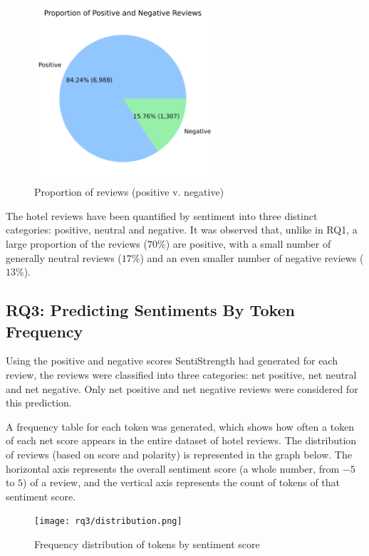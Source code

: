 \documentclass[12pt, bibliography=totocnumbered, paper=a4]{scrartcl}
\begin{document}
\begin{figure}[htpb]
	\begin{center}
		\includegraphics[width=0.6\textwidth]{rq2/pie_chart_2part.png}
	\end{center}
	\caption{Proportion of reviews (positive v. negative)}
	\label{fig:reviews-pie4}
\end{figure}

The hotel reviews have been quantified by sentiment into three distinct categories:
positive, neutral and negative. It was observed that, unlike in RQ1, a large proportion
of the reviews ($70\%$) are positive, with a small number of generally neutral reviews ($17\%$)
and an even smaller number of negative reviews ($13\%$).

\subsection{RQ3: Predicting Sentiments By Token Frequency}
Using the positive and negative scores SentiStrength had generated for
each review, the reviews were classified into three categories: net positive,
net neutral and net negative. Only net positive and net negative reviews were
considered for this prediction.

A frequency table for each token was generated, which shows
how often a token of each net score appears in the entire dataset
of hotel reviews. The distribution of reviews (based on score and
polarity) is represented in the graph below. The horizontal axis represents
the overall sentiment score (a whole number, from $-5$ to $5$) of a review,
and the vertical axis represents the count of tokens of that sentiment score.

\begin{figure}[htpb]
	\begin{center}
		\texttt{[image: rq3/distribution.png]}
	\end{center}
	\caption{Frequency distribution of tokens by sentiment score}
	\label{fig:hist}
\end{figure}
\end{document}
